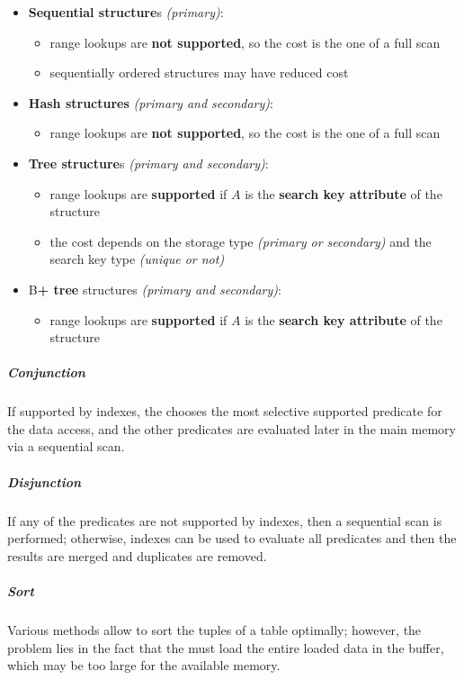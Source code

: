 \documentclass[english]{article}
\begin{document}
\begin{itemize}
  \item \textbf{Sequential structure}s \textit{(primary)}:
        \begin{itemize}[label=\xmarkthin]
          \item range lookups are \textbf{not supported}, so the cost is the one of a full scan
          \item sequentially ordered structures may have reduced cost
        \end{itemize}
  \item \textbf{Hash structures} \textit{(primary and secondary)}:
        \begin{itemize}[label=\xmarkthin]
          \item range lookups are \textbf{not supported}, so the cost is the one of a full scan
        \end{itemize}
  \item \textbf{Tree structure}s \textit{(primary and secondary)}:
        \begin{itemize}[label=\cmarkthin]
          \item range lookups are \textbf{supported} if \(A\) is the \textbf{search key attribute} of the structure
          \item the cost depends on the storage type \textit{(primary or secondary)} and the search key type \textit{(unique or not)}
        \end{itemize}
  \item B\textbf{+ tree} structures \textit{(primary and secondary)}:
        \begin{itemize}[label=\cmarkthin]
          \item range lookups are \textbf{supported} if \(A\) is the \textbf{search key attribute} of the structure
        \end{itemize}
\end{itemize}

\subparagraph*{Conjunction}
If supported by indexes, the \dbms chooses the most selective supported predicate for the data access, and the other predicates are evaluated later in the main memory via a sequential scan.

\subparagraph*{Disjunction}
If any of the predicates are not supported by indexes, then a sequential scan is performed;
otherwise, indexes can be used to evaluate all predicates and then the results are merged and duplicates are removed.

\subparagraph*{Sort}
Various methods allow to sort the tuples of a table optimally;
however, the problem lies in the fact that the \dbms must load the entire loaded data in the buffer, which may be too large for the available memory.
\end{document}
